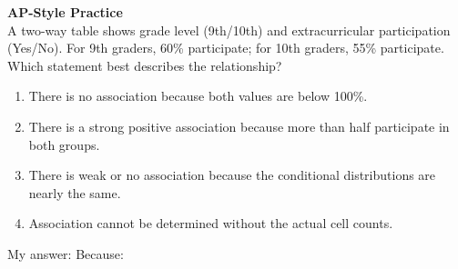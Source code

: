\documentclass[10pt]{article}
\begin{document}
\vspace{0.2in}

\begin{tcolorbox}[colback=redbg, colframe=redacc, boxrule=0.8pt, arc=2mm,
    left=4mm, right=4mm, top=3mm, bottom=3mm]
\small\textbf{AP-Style Practice}\\[6pt]
A two-way table shows grade level (9th/10th) and extracurricular participation
(Yes/No). For 9th graders, 60\% participate; for 10th graders, 55\% participate.
Which statement best describes the relationship?

\vspace{10pt}
\begin{enumerate}[label=\textbf{(\Alph*)}, leftmargin=2em, itemsep=6pt]
  \item There is no association because both values are below 100\%.
  \item There is a strong positive association because more than half participate in both groups.
  \item There is weak or no association because the conditional distributions are nearly the same.
  \item Association cannot be determined without the actual cell counts.
\end{enumerate}
\end{tcolorbox}

\vspace{0.12in}
\noindent\textcolor{slate}{\small My answer: \blank{1cm} \quad Because: \blank{8.5cm}}
\end{document}
